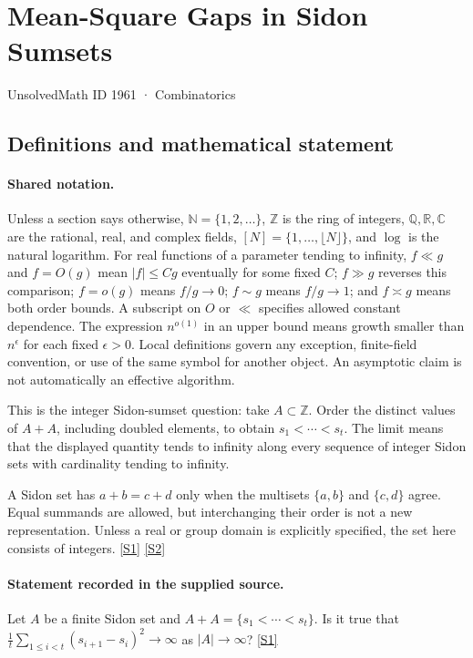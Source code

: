 \documentclass[11pt,a4paper]{article}
\newcommand{\N}{\mathbb{N}}
\newcommand{\Z}{\mathbb{Z}}
\newcommand{\Q}{\mathbb{Q}}
\newcommand{\R}{\mathbb{R}}
\newcommand{\C}{\mathbb{C}}
\newcommand{\sref}[2]{\hyperlink{source:#1:#2}{[S#2]}}
\begin{document}

\setcounter{section}{1960}

\section{Mean-Square Gaps in Sidon Sumsets}\label{1961}

{\small\sffamily UnsolvedMath ID 1961 · Combinatorics}

\subsection{Definitions and mathematical statement}

\paragraph{Shared notation.}Unless a section says otherwise, $\N=\{1,2,\ldots\}$,
$\Z$ is the ring of integers, $\Q,\R,\C$ are the rational, real, and complex
fields, $[N]=\{1,\ldots,\lfloor N\rfloor\}$, and $\log$ is the natural
logarithm. For real functions of a parameter tending to infinity,
$f\ll g$ and $f=O(g)$ mean $|f|\leq Cg$ eventually for some fixed $C$;
$f\gg g$ reverses this comparison; $f=o(g)$ means $f/g\to0$;
$f\sim g$ means $f/g\to1$; and $f\asymp g$ means both order bounds.
A subscript on $O$ or $\ll$ specifies allowed constant dependence.
The expression $n^{o(1)}$ in an upper bound means growth smaller than
$n^\epsilon$ for each fixed $\epsilon>0$. Local definitions govern any
exception, finite-field convention, or use of the same symbol for another
object. An asymptotic claim is not automatically an effective algorithm.



This is the integer Sidon-sumset question: take $A\subset\Z$. Order the distinct values of $A+A$, including doubled elements, to obtain $s_1<\cdots<s_t$. The limit means that the displayed quantity tends to infinity along every sequence of integer Sidon sets with cardinality tending to infinity.

A Sidon set has $a+b=c+d$ only when the multisets $\{a,b\}$ and $\{c,d\}$ agree. Equal summands are allowed, but interchanging their order is not a new representation. Unless a real or group domain is explicitly specified, the set here consists of integers. \sref{1961}{1} \sref{1961}{2}

\paragraph{Statement recorded in the supplied source.}
Let $A$ be a finite Sidon set and $A+A=\{s_1<\cdots<s_t\}$. Is it true that $ \frac{1}{t}\sum_{1\leq i<t}(s_{i+1}-s_i)^2 \to \infty $ as $\lvert A\rvert\to \infty$? \sref{1961}{1}
\end{document}
